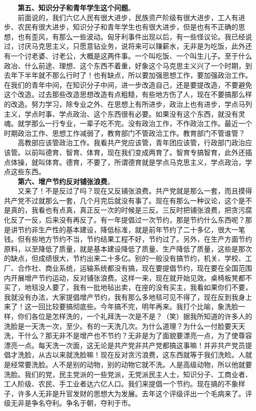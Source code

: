 \documentclass[cn,11pt,chinese]{elegantbook}
\begin{document}
　　\textbf{第五、知识分子和青年学生这个问题}。\\
　　前面说的，我们六亿人民有很大进步，民族资产阶级有很大进步，工人有进步、农民有很大进步，知识分子和青年学生也有很大进步，但是也有不正确的思想，也有歪风，有那么一些波动。匈牙利事件出现以后，有一些怪议论。我已经说过，讨厌马克思主义，只愿意钻业务，说将来可以赚薪水，无非是为吃饭，此外还有一个讨老婆、讨老公，大概是这两件事。一个叫吃饭、一个叫生儿子。至于什么政冶、什么前途、理想、这个东西不着重，好象这个马克思主义兴了一个时期，到去年下半年就不那么行时了！也有缺点，所以要加强思想工作，要加强政治工作。在我们的青年中间，在知识分子中间，进一步改造自己，还是要提改造，不要避免这个改造。过去那些改造思想改造有点粗糙，有些地方伤了人，现在不要搞那么样的改造。努力学习，除专业之外、在思想上有所进步，政治上也有进步，学点马列主义，学点时事、学点政治、这个东西很有必要。如果没有这个东西，就没有灵魂。就学那么一行专业，一辈子吃不完。没有政治工作，不作政治工作。最近一个时期政治工作、思想工作减弱了，教育部门不管政洽工作。教育部门不管谁管？\\
　　高教部应该管政治工作。我看共产党应该管，青年团应该管，行政部门政治应该管。以前叫德育、智育、体育，现在我们变成两育了。智育专搞智育，此外还插点体操，就叫体育。德育，不要了，所谓德育就是学点马克思主义，学点政治，学点这些东西。\\
　　\textbf{第六、增产节约反对铺张浪费}。\\
　　又来了！不是反过了吗？现在又反铺张浪费。共产党就是那么一套，而且摸得共产党不过就那么一套，几个月完后就没有事了。现在有那么一种议论，这个是不是真的，我看也有点真，真正反一次的时候是三反。三反时把铺张浪费，把贪污腐化反了一反，后来没有再反了。有一年提倡过一次节约，那是节约什么东西呢？那是讲节约非生产性的基本建设，降低标准，就是前年节约了二十多亿，很大一笔钱。但有些地方节约不当，节约结果工程不好，节约过了。另外，在生产方面节约原料，以至降低了质量，就是基本建设降低了质量、生产降低了质量，这些是那次的缺点，但成绩很大，节约出来二十多亿。别的一般没有搞节约，机关、学校、工厂、合作社、商业系统，运输系统都没有搞，现在要提倡节约，现在要在全国范围内开展增产节约运动，反对铺张浪费。这样一来，现在就开始见效。桌椅板凳都不买了，地毯没人要了，我有一批地毡出卖，在座的没有买主，我看如果你们不要，我就没有办法，大家提倡增产节约，我有那么多地毯可见不得了，现在反到我身上来了！这一回比较要搞彻底些。今年搞不完，明年再来。我打个比喻，象洗脸一样，你们各位是怎样洗的，一个礼拜洗一次是不是？（笑）据我所知道的许多人的洗脸是一天洗一次，至少。有的一天洗几次。为什么道理？为什么一付脸要天天洗，干什么？那无非不是增产也不节约？无非是为了面貌要漂亮一点，为了使尊容漂亮一点。每天洗一次面，这无论是共产党非共产党都搞这事嘛！并非共产党员提倡才洗脸，从古以来就洗脸嘛！现在反对贪污浪费，这东西就等于我们洗睑。人就是经常要洗脸。人不是别的动物，别的动物它就不洗。人是高级动物，所以他就要洗脸。我们的党，民主党派的一些党派，无党派民主人士，知识分子、工商业者、工人阶级、农民、手工业者达六亿人口。我们来提倡一个节约。现在搞的不象样子，许多人无非是升官发财的思想大为发展。去年这个评级评出一个毛病来了。评级无非是争名夺利。争名于朝，夺利于市。\\
\end{document}
